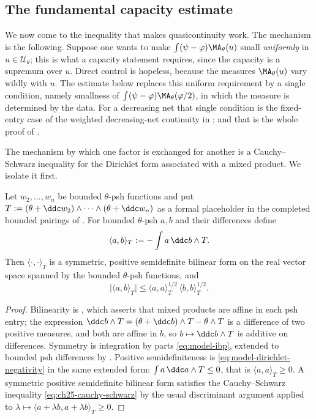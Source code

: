 \subsection{The fundamental capacity estimate}
\label{sec:ch25-fundamental}

We now come to the inequality that makes quasicontinuity work.  The
mechanism is the following.  Suppose one wants to make
$\int(\psi-\varphi)\MA_\theta(u)$ small \emph{uniformly} in
$u\in\mathcal U_\theta$; this is what a capacity statement requires, since
the capacity is a supremum over $u$.  Direct control is hopeless, because
the measures $\MA_\theta(u)$ vary wildly with $u$.  The estimate below
replaces this uniform requirement by a single condition, namely smallness of
$\int(\psi-\varphi)\MA_\theta(\varphi/2)$, in which the measure is
determined by the data.  For a decreasing net that single condition is the
fixed-entry case of the weighted decreasing-net continuity in
; and that is the whole proof of
.

The mechanism by which one factor is exchanged for another is a
Cauchy--Schwarz inequality for the Dirichlet form associated with a mixed
product.  We isolate it first.

\begin{lemma}
\label{lem:ch25-dirichlet-form}
Let $w_2,\ldots,w_n$ be bounded $\theta$-psh functions and put
$T:=(\theta+\ddc w_2)\wedge\cdots\wedge(\theta+\ddc w_n)$ as a formal
placeholder in the completed bounded pairings of
.  For bounded
$\theta$-psh $a,b$ and their differences define
\[
 \langle a,b\rangle_T:=-\int a\,\ddc b\wedge T .
\]
Then $\langle\cdot,\cdot\rangle_T$ is a symmetric, positive semidefinite
bilinear form on the real vector space spanned by the bounded
$\theta$-psh functions, and
\begin{equation}
\label{eq:ch25-cauchy-schwarz}
 \bigl|\langle a,b\rangle_T\bigr|
 \leq\langle a,a\rangle_T^{1/2}\,\langle b,b\rangle_T^{1/2}.
\end{equation}
\end{lemma}

\begin{proof}
Bilinearity is , which asserts that mixed
products are affine in each psh entry; the expression
$\ddc b\wedge T=(\theta+\ddc b)\wedge T-\theta\wedge T$ is a difference of
two positive measures, and both are affine in $b$, so
$b\mapsto\ddc b\wedge T$ is additive on differences.  Symmetry is
integration by parts \eqref{eq:model-ibp}, extended to bounded psh
differences by .  Positive
semidefiniteness is \eqref{eq:model-dirichlet-negativity} in the same
extended form: $\int a\,\ddc a\wedge T\leq0$, that is
$\langle a,a\rangle_T\geq0$.  A symmetric positive semidefinite bilinear
form satisfies the Cauchy--Schwarz inequality
\eqref{eq:ch25-cauchy-schwarz} by the usual discriminant argument applied to
$\lambda\mapsto\langle a+\lambda b,a+\lambda b\rangle_T\geq0$.
\end{proof}

